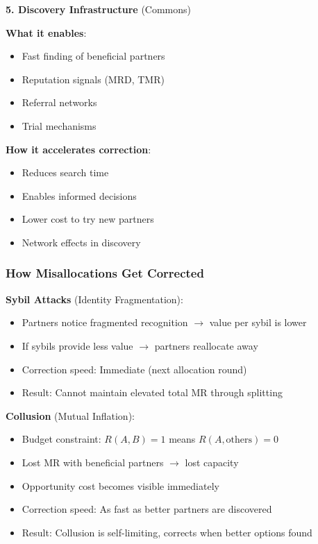 \documentclass[11pt,a4paper]{article}
\theoremstyle{definition}
\theoremstyle{remark}
\begin{document}
\textbf{5. Discovery Infrastructure} (Commons)

\textbf{What it enables}:
\begin{itemize}
\item Fast finding of beneficial partners
\item Reputation signals (MRD, TMR)
\item Referral networks
\item Trial mechanisms
\end{itemize}

\textbf{How it accelerates correction}:
\begin{itemize}
\item Reduces search time
\item Enables informed decisions
\item Lower cost to try new partners
\item Network effects in discovery
\end{itemize}

\subsubsection{How Misallocations Get Corrected}

\textbf{Sybil Attacks} (Identity Fragmentation):
\begin{itemize}
\item Partners notice fragmented recognition $\rightarrow$ value per sybil is lower
\item If sybils provide less value $\rightarrow$ partners reallocate away
\item Correction speed: Immediate (next allocation round)
\item Result: Cannot maintain elevated total MR through splitting
\end{itemize}

\textbf{Collusion} (Mutual Inflation):
\begin{itemize}
\item Budget constraint: $R(A,B)=1$ means $R(A,\text{others})=0$
\item Lost MR with beneficial partners $\rightarrow$ lost capacity
\item Opportunity cost becomes visible immediately
\item Correction speed: As fast as better partners are discovered
\item Result: Collusion is self-limiting, corrects when better options found
\end{itemize}
\end{document}
